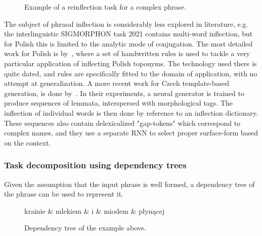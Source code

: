 \documentclass[12pt]{article}
\newcommand{\symbolic}[1]{\textit{\textbf{#1}}}
\begin{document}
\begin{figure}[H]
\caption{Example of a reinflection task for a complex phrase.}
\label{fig:phrase_task}
\end{figure}

The subject of phrasal inflection is considerably less explored in literature, e.g. the interlinguistic SIGMORPHON task 2021 \cite{pimentel-ryskina-etal-2021-sigmorphon} contains multi-word inflection, but for Polish this is limited to the analytic mode of conjugation. The most detailed work for Polish is by~\cite{sav:09}, where a set of handwritten rules is used to tackle a very particular application of inflecting Polish toponyms. The technology used there is quite dated, and rules are specifically fitted to the domain of application, with no attempt at generalization. A more recent work for Czech template-based generation, is done by~\cite{DBLP:conf/inlg/DusekJ19}. In their experiments, a neural generator is trained to produce sequences of lemmata, interspersed with morphological tags. The inflection of individual words is then done by reference to an inflection dictionary. These sequences also contain delexicalized "gap-tokens" which correspond to complex names, and they use a separate RNN to select proper surface-form based on the context.

\subsubsection{Task decomposition using dependency trees}
Given the assumption that the input phrase is well formed, a dependency tree of the phrase can be used to represent it.

\begin{figure}[H]
\centering
\begin{dependency}[edge slant=0]
\begin{deptext}[column sep=0.5cm]
krainie \& mlekiem  \& i \& miodem \& płynącej \\
\end{deptext}
\end{dependency}
\caption{Dependency tree of the example above.} \label{tree:task}
\end{figure}
\end{document}
